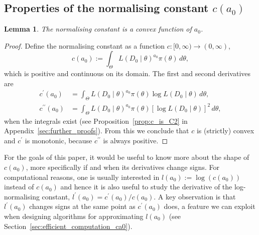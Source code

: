 \documentclass[a4paper, notitlepage, 11pt]{article}
\newtheorem{lemma}{Lemma}[]
\begin{document}
\subsection{Properties of the normalising constant $c(a_0)$}

\begin{lemma}
\label{lm:convex_norm_constant}
 The normalising constant is a convex function of $a_0$.
\end{lemma}
\begin{proof}
Define the normalising constant as a function $c : [0, \infty) \to (0, \infty)$,
\begin{equation}
 \label{eq:normconst}
 c(a_0) := \int_{\Theta} L(D_0 \mid \theta)^{a_0} \pi(\theta)\, d\theta,
\end{equation}
which is positive and continuous on its domain.
The first and second derivatives are
\begin{align}
\label{eq:derivative_ca0}
c^\prime(a_0) &= \int_{\Theta} L(D_0 \mid \theta)^{a_0} \pi(\theta) \log L(D_0 \mid \theta) \, d\theta, \\
c^{\prime\prime}(a_0) &= \int_{\Theta} L(D_0 \mid \theta)^{a_0} \pi(\theta) [\log L(D_0 \mid \theta)]^2 \, d\theta,
\end{align}
when the integrals exist (see Proposition~\ref{prop:c_is_C2} in Appendix~\ref{sec:further_proofs}). %
From this we conclude that $c$ is (strictly) convex and $c^\prime$ is monotonic, because $c^{\prime\prime}$ is always positive.
\end{proof}
For the goals of this paper, it would be useful to know more about the shape of $c(a_0)$, more specifically if and when its derivatives change signs.
For computational reasons, one is usually interested in $l(a_0) := \log(c(a_0)) $ instead of $c(a_0)$ and hence it is also useful to study the derivative of the log-normalising constant, $l^\prime(a_0) = c^\prime(a_0)/c(a_0)$.
A key observation is that $l^\prime(a_0)$ changes signs at the same point as $c^\prime(a_0)$ does, a feature we can exploit when designing algorithms for approximating $l(a_0)$ (see Section~\ref{sec:efficient_computation_ca0}).
\end{document}
